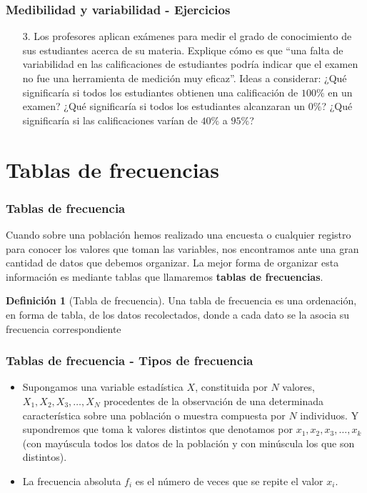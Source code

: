 \documentclass[10pt]{beamer}
\theoremstyle{plain} %
\theoremstyle{definition}
\newtheorem{defn}{Definición}
\theoremstyle{remark}
\begin{document}
\begin{frame}
\frametitle{Medibilidad y variabilidad - Ejercicios}
\begin{itemize}
\justifying
\item[3.]Los profesores aplican exámenes para medir el grado de conocimiento de sus estudiantes acerca de su materia. Explique cómo es que ``una falta de variabilidad en las calificaciones de estudiantes podría indicar que el examen no fue una herramienta de medición muy eficaz''. Ideas a considerar: ¿Qué significaría si todos los estudiantes obtienen una calificación de $100\%$ en un examen? ¿Qué significaría si todos los estudiantes alcanzaran un $0\%$? ¿Qué significaría si las calificaciones varían de $40\%$ a $95\%$?
\end{itemize} 
\end{frame}

\section{Tablas de frecuencias}
\begin{frame}
\frametitle{Tablas de frecuencia}
Cuando sobre una población hemos realizado una encuesta o cualquier registro para conocer los valores que toman las variables, nos encontramos ante una gran cantidad de datos que debemos organizar. La mejor forma de organizar esta información es mediante tablas que llamaremos \textbf{tablas de frecuencias}.\\

\begin{defn}[Tabla de frecuencia]
Una tabla de frecuencia es una ordenación, en forma de tabla, de los datos recolectados, donde a cada dato se la asocia su frecuencia correspondiente 
\end{defn}
\end{frame}

\begin{frame}
\frametitle{Tablas de frecuencia - Tipos de frecuencia}
\begin{itemize}[<+->]
\justifying
\begin{defn}[Frecuencia absoluta]
La frecuencia absoluta es el número de veces que aparece un determinado valor en un estudio estadístico. Se representa por $f_i$.
\end{defn}
\item Supongamos una variable estadística $X$, constituida por $N$ valores, $X_1, X_2, X_3, \ldots, X_N$ procedentes de la observación de una determinada característica sobre una población o muestra compuesta por $N$ individuos. Y supondremos que toma k valores distintos que denotamos por $x_1, x_2, x_3, \ldots, x_k$ (con mayúscula todos los datos de la población y con minúscula los que son distintos).
\item La frecuencia absoluta $f_i$ es el número de veces que se repite el valor $x_i$.

\end{itemize} 
\end{frame}
\end{document}
